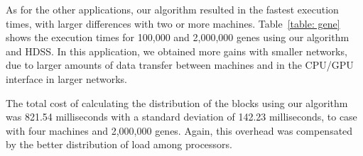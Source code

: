 \documentclass[journal]{IEEEtran}
\begin{document}
As for the other applications, our algorithm resulted in the fastest execution
times, with larger differences with two or more machines. Table~\ref{table:
  gene} shows the execution times for 100,000 and 2,000,000 genes using our
algorithm and HDSS. In this application, we obtained more gains with smaller
networks, due to larger amounts of data transfer between machines and in the
CPU/GPU interface in larger networks.

%

The total cost of calculating the distribution of the blocks using our algorithm
was 821.54 milliseconds with a standard deviation of 142.23 milliseconds, to case with four machines and 2,000,000 genes. Again,
this overhead was compensated by the better distribution of load among
processors.

\end{document}
